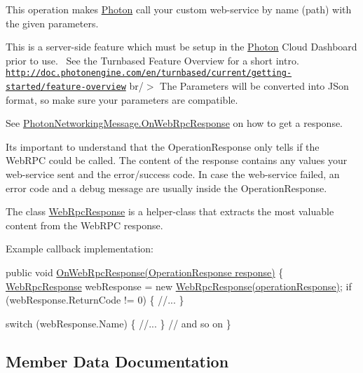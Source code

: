 This operation makes \hyperlink{namespace_photon}{Photon} call your custom web-\/service by name (path) with the given parameters. 

This is a server-\/side feature which must be setup in the \hyperlink{namespace_photon}{Photon} Cloud Dashboard prior to use.~\newline
 See the Turnbased Feature Overview for a short intro.~\newline
 \href{http://doc.photonengine.com/en/turnbased/current/getting-started/feature-overview}{\tt http\+://doc.\+photonengine.\+com/en/turnbased/current/getting-\/started/feature-\/overview} br/$>$ The Parameters will be converted into J\+Son format, so make sure your parameters are compatible.

See \hyperlink{group__public_api_ggaf30bbea51cc8c4b1ddc239d1c5c1468faa98a8b15d4aa12e02e5ccbc98172eecc}{Photon\+Networking\+Message.\+On\+Web\+Rpc\+Response} on how to get a response.

It\textquotesingle{}s important to understand that the Operation\+Response only tells if the Web\+R\+PC could be called. The content of the response contains any values your web-\/service sent and the error/success code. In case the web-\/service failed, an error code and a debug message are usually inside the Operation\+Response.

The class \hyperlink{class_web_rpc_response}{Web\+Rpc\+Response} is a helper-\/class that extracts the most valuable content from the Web\+R\+PC response. 

Example callback implementation\+:
\begin{DoxyPre}\end{DoxyPre}



\begin{DoxyPre}public void \hyperlink{group__public_api_ggaf30bbea51cc8c4b1ddc239d1c5c1468faa98a8b15d4aa12e02e5ccbc98172eecc}{OnWebRpcResponse(OperationResponse response)}
\{
    \hyperlink{class_web_rpc_response}{WebRpcResponse} webResponse = new \hyperlink{class_web_rpc_response}{WebRpcResponse(operationResponse)};
    if (webResponse.ReturnCode != 0) \{ //...
    \}\end{DoxyPre}



\begin{DoxyPre}    switch (webResponse.Name) \{ //...
    \}
    // and so on
\}\end{DoxyPre}
 

\subsection{Member Data Documentation}

